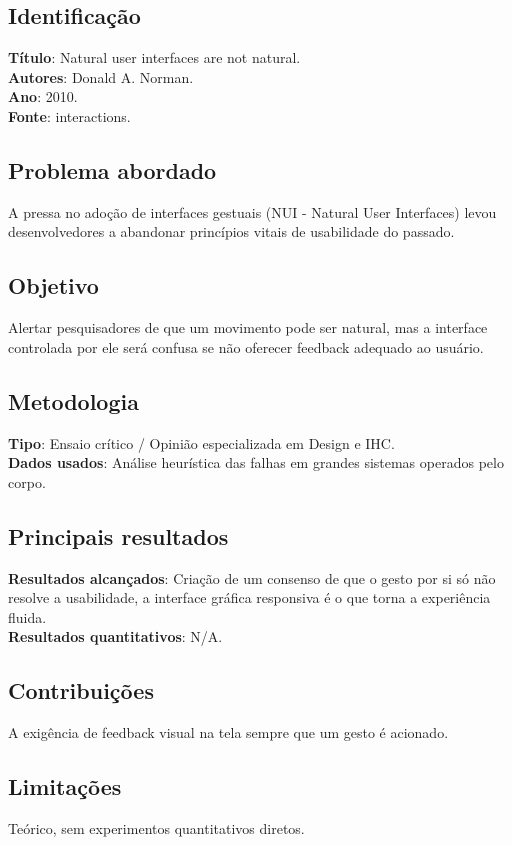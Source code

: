 \documentclass[12pt, a4paper]{article}
\begin{document}
\subsection{Identificação}
\textbf{Título}: Natural user interfaces are not natural.\\
\textbf{Autores}: Donald A. Norman.\\
\textbf{Ano}: 2010.\\
\textbf{Fonte}: interactions.\\
\subsection{Problema abordado}
A pressa no adoção de interfaces gestuais (NUI - Natural User Interfaces) levou desenvolvedores a abandonar princípios vitais de usabilidade do passado.\\
\subsection{Objetivo}
Alertar pesquisadores de que um movimento pode ser natural, mas a interface controlada por ele será confusa se não oferecer feedback adequado ao usuário.\\
\subsection{Metodologia}
\textbf{Tipo}: Ensaio crítico / Opinião especializada em Design e IHC.\\
\textbf{Dados usados}: Análise heurística das falhas em grandes sistemas operados pelo corpo.\\
\subsection{Principais resultados}
\textbf{Resultados alcançados}: Criação de um consenso de que o gesto por si só não resolve a usabilidade, a interface gráfica responsiva é o que torna a experiência fluida.\\
\textbf{Resultados quantitativos}: N/A.\\
\subsection{Contribuições}
A exigência de feedback visual na tela sempre que um gesto é acionado.\\
\subsection{Limitações}
Teórico, sem experimentos quantitativos diretos.\\
\end{document}
